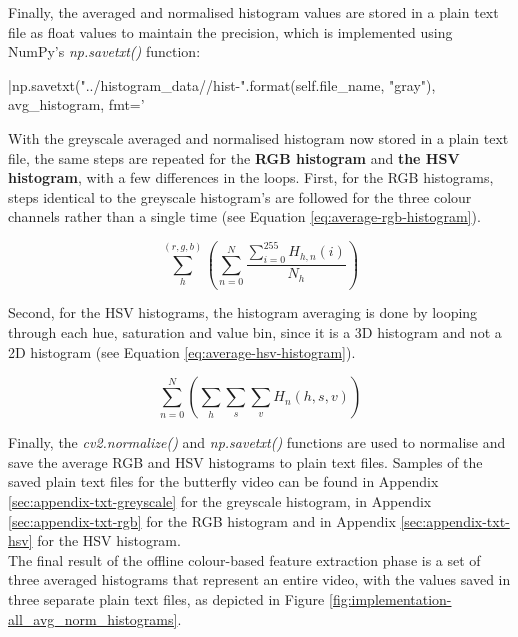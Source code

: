 Finally, the averaged and normalised histogram values are stored in a plain text file as float values to maintain the precision, which is implemented using NumPy's \textit{np.savetxt()} function:

|np.savetxt("../histogram_data/{}/hist-{}".format(self.file_name, "gray"), avg_histogram, fmt='%

With the greyscale averaged and normalised histogram now stored in a plain text file, the same steps are repeated for the \textbf{RGB histogram} and \textbf{the HSV histogram}, with a few differences in the loops. First, for the RGB histograms, steps identical to the greyscale histogram's are followed for the three colour channels rather than a single time (see Equation \ref{eq:average-rgb-histogram}).

\begin{equation}
\label{eq:average-rgb-histogram}
    \sum_{h}^{(r,g,b)} (\sum_{n=0}^{N} \frac{\sum_{i=0}^{255} H_{h,n}(i)}{N_h})
\end{equation}

Second, for the HSV histograms, the histogram averaging is done by looping through each hue, saturation and value bin, since it is a 3D histogram and not a 2D histogram (see Equation \ref{eq:average-hsv-histogram}).

\begin{equation}
\label{eq:average-hsv-histogram}
    \sum_{n=0}^{N}(\sum_h \sum_s \sum_v H_n(h,s,v))
\end{equation}

Finally, the \textit{cv2.normalize()} and \textit{np.savetxt()} functions are used to normalise and save the average RGB and HSV histograms to plain text files. Samples of the saved plain text files for the butterfly video can be found in Appendix \ref{sec:appendix-txt-greyscale} for the greyscale histogram, in Appendix \ref{sec:appendix-txt-rgb} for the RGB histogram and in Appendix \ref{sec:appendix-txt-hsv} for the HSV histogram.\\

The final result of the offline colour-based feature extraction phase is a set of three averaged histograms that represent an entire video, with the values saved in three separate plain text files, as depicted in Figure \ref{fig:implementation-all_avg_norm_histograms}.\\

